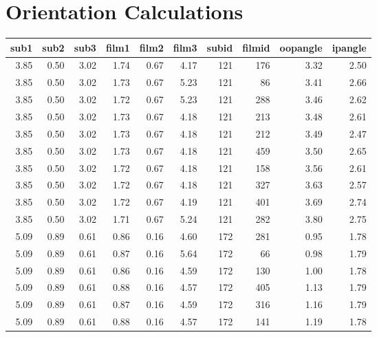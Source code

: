 \chapter{Orientation Calculations}
\label{ch:orientation.calculations}



	\begin{longtable}{rrrrrrrrrr}
	
	sub1	&	sub2	&	sub3	&	film1	&	film2	&	film3	&	subid	&	filmid	&	oopangle	&	ipangle	\\
		
		\cmidrule(lr){1-1}
		\cmidrule(lr){2-2}
		\cmidrule(lr){3-3}
		\cmidrule(lr){4-4}
		\cmidrule(lr){5-5}
		\cmidrule(lr){6-6}
		\cmidrule(lr){7-7}
		\cmidrule(lr){8-8}
		\cmidrule(lr){9-9}
		\cmidrule(lr){10-10}
	\endhead

3.85	&	0.50	&	3.02	&	1.74	&	0.67	&	4.17	&	121	&	176	&	3.32	&	2.50	\\
3.85	&	0.50	&	3.02	&	1.73	&	0.67	&	5.23	&	121	&	86	&	3.41	&	2.66	\\
3.85	&	0.50	&	3.02	&	1.72	&	0.67	&	5.23	&	121	&	288	&	3.46	&	2.62	\\
3.85	&	0.50	&	3.02	&	1.73	&	0.67	&	4.18	&	121	&	213	&	3.48	&	2.61	\\
3.85	&	0.50	&	3.02	&	1.73	&	0.67	&	4.18	&	121	&	212	&	3.49	&	2.47	\\
3.85	&	0.50	&	3.02	&	1.73	&	0.67	&	4.18	&	121	&	459	&	3.50	&	2.65	\\
3.85	&	0.50	&	3.02	&	1.72	&	0.67	&	4.18	&	121	&	158	&	3.56	&	2.61	\\
3.85	&	0.50	&	3.02	&	1.72	&	0.67	&	4.18	&	121	&	327	&	3.63	&	2.57	\\
3.85	&	0.50	&	3.02	&	1.72	&	0.67	&	4.19	&	121	&	401	&	3.69	&	2.74	\\
3.85	&	0.50	&	3.02	&	1.71	&	0.67	&	5.24	&	121	&	282	&	3.80	&	2.75	\\
5.09	&	0.89	&	0.61	&	0.86	&	0.16	&	4.60	&	172	&	281	&	0.95	&	1.78	\\
5.09	&	0.89	&	0.61	&	0.87	&	0.16	&	5.64	&	172	&	66	&	0.98	&	1.79	\\
5.09	&	0.89	&	0.61	&	0.86	&	0.16	&	4.59	&	172	&	130	&	1.00	&	1.78	\\
5.09	&	0.89	&	0.61	&	0.88	&	0.16	&	4.57	&	172	&	405	&	1.13	&	1.79	\\
5.09	&	0.89	&	0.61	&	0.87	&	0.16	&	4.59	&	172	&	316	&	1.16	&	1.79	\\
5.09	&	0.89	&	0.61	&	0.88	&	0.16	&	4.57	&	172	&	141	&	1.19	&	1.78	\\

\end{longtable}
